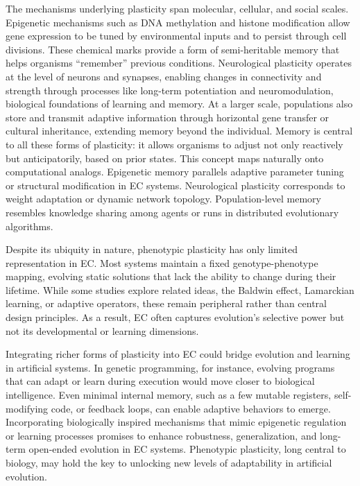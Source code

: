 The mechanisms underlying plasticity span molecular, cellular, and social scales.
Epigenetic mechanisms such as DNA methylation and histone modification allow gene expression to be tuned by environmental inputs and to persist through cell divisions.
These chemical marks provide a form of semi-heritable memory that helps organisms ``remember'' previous conditions.
Neurological plasticity operates at the level of neurons and synapses, enabling changes in connectivity and strength through processes like long-term potentiation and neuromodulation, biological foundations of learning and memory.
At a larger scale, populations also store and transmit adaptive information through horizontal gene transfer or cultural inheritance, extending memory beyond the individual.
Memory is central to all these forms of plasticity: it allows organisms to adjust not only reactively but anticipatorily, based on prior states.
This concept maps naturally onto computational analogs.
Epigenetic memory parallels adaptive parameter tuning or structural modification in EC systems.
Neurological plasticity corresponds to weight adaptation or dynamic network topology.
Population-level memory resembles knowledge sharing among agents or runs in distributed evolutionary algorithms.

Despite its ubiquity in nature, phenotypic plasticity has only limited representation in EC.
Most systems maintain a fixed genotype-phenotype mapping, evolving static solutions that lack the ability to change during their lifetime.
While some studies explore related ideas, the Baldwin effect, Lamarckian learning, or adaptive operators, these remain peripheral rather than central design principles.
As a result, EC often captures evolution's selective power but not its developmental or learning dimensions.

Integrating richer forms of plasticity into EC could bridge evolution and learning in artificial systems.
In genetic programming, for instance, evolving programs that can adapt or learn during execution would move closer to biological intelligence.
Even minimal internal memory, such as a few mutable registers, self-modifying code, or feedback loops, can enable adaptive behaviors to emerge.
Incorporating biologically inspired mechanisms that mimic epigenetic regulation or learning processes promises to enhance robustness, generalization, and long-term open-ended evolution in EC systems.
Phenotypic plasticity, long central to biology, may hold the key to unlocking new levels of adaptability in artificial evolution.




